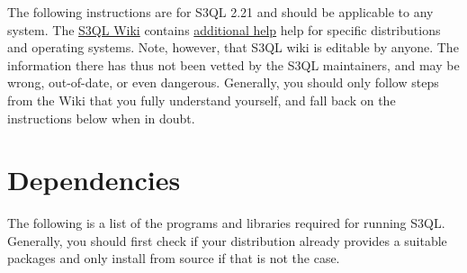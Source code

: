 \documentclass[letterpaper,10pt,english]{sphinxmanual}
\begin{document}
The following instructions are for S3QL 2.21 and should be
applicable to any system. The \href{https://bitbucket.org/nikratio/s3ql/wiki/Home}{S3QL Wiki} contains \href{https://bitbucket.org/nikratio/s3ql/wiki/Installation}{additional
help} help
for specific distributions and operating systems. Note, however, that
S3QL wiki is editable by anyone. The information there has thus not
been vetted by the S3QL maintainers, and may be wrong, out-of-date, or
even dangerous. Generally, you should only follow steps from the Wiki
that you fully understand yourself, and fall back on the instructions
below when in doubt.


\section{Dependencies}
\label{installation:dependencies}
The following is a list of the programs and libraries required for
running S3QL. Generally, you should first check if your distribution
already provides a suitable packages and only install from source if
that is not the case.
\end{document}
